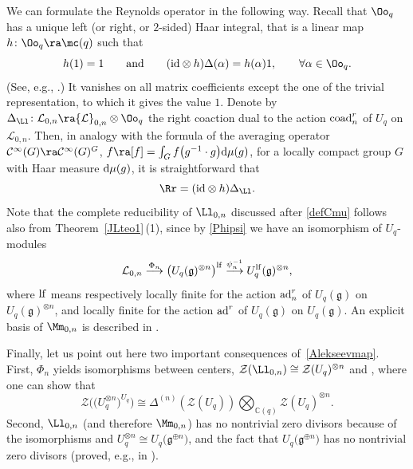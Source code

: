 We can formulate the Reynolds operator in the following way. Recall that $\Oo_q$ has a unique left (or right, or $2$-sided) Haar integral, that is a linear map $h\colon \Oo_q\ra \mc(q)$ such that
\[%
h(1)=1 \qquad \text{and}\qquad ({\rm id}\otimes h)\Delta(\alpha) = h(\alpha)1,\qquad \forall \alpha\in \Oo_q.
\]
(See, e.g., \cite[Proposition 13.3.6]{CP}.) It vanishes on all matrix coefficients except the one of the trivial representation, to which it gives the value $1$. Denote by $\Delta_\Ll\colon {\mathcal L}_{0,n} \ra {\mathcal L}_{0,n}\otimes \Oo_q$ the right coaction dual to the action ${\rm coad}_n^r$ of $U_q$ on ${\mathcal L}_{0,n}$. Then, in analogy with the formula of the averaging operator $\mathcal{C}^\infty(G) \ra \mathcal{C}^\infty(G)^G$, $f\ra [f] = \int_G f\big(g^{-1} \cdot g\big) {\rm d}\mu(g)$, for a locally compact group $G$ with Haar measure ${\rm d}\mu(g)$, it is straightforward that
\begin{equation}\label{formuleRh}
\Rr = ({\rm id}\otimes h)\Delta_\Ll .
\end{equation}
Note that the complete reducibility of $\Ll_{0,n}$ discussed after \eqref{defCmu} follows also from Theorem~\ref{JLteo1}\,(1), since by \eqref{Phipsi} we have an isomorphism of $U_q$-modules
\[%
{\mathcal L}_{0,n} \stackrel{\Phi_n}{\longrightarrow} \big(U_q({\mathfrak g})^{\otimes n}\big)^{\rm lf} \stackrel{\psi_n^{-1}}{\longrightarrow}U_q^{\rm lf}({\mathfrak g})^{\otimes n},
\]
where ${\rm lf}$ means respectively locally finite for the action ${\rm ad}_n^r$ of $U_q({\mathfrak g})$ on $U_q({\mathfrak g})^{\otimes n}$, and locally finite for the action ${\rm ad}^r$ of $U_q({\mathfrak g})$ on $U_q({\mathfrak g})$. An explicit basis of $\Mm_{0,n}$ is described in \cite[Pro\-po\-sition~6.22]{BR}.

Finally, let us point out here two important consequences of~\eqref{Alekseevmap}. First, $\Phi_n$ yields isomorphisms between centers, $\mathcal{Z}(\Ll_{0,n}) \cong \mathcal{Z}(U_q)^{\otimes n}$ and , where one can show that \cite[Lemma 6.29]{BR}
\begin{equation}\label{Zinv}
\mathcal{Z}\big(\big(U_{q}^{\otimes n}\big)^{U_q}\big)\cong \Delta^{(n)}(\mathcal{Z}(U_q))\bigotimes_{{\mathbb C}(q)}\mathcal{Z}(U_q)^{\otimes n}.
\end{equation}
Second, $\Ll_{0,n}$ (and therefore $\Mm_{0,n}$) has no nontrivial zero divisors because of the isomorphisms  and $U_q^{\otimes n}\cong U_q\big(\mathfrak{g}^{\oplus n}\big)$, and the fact that $U_q\big(\mathfrak{g}^{\oplus n}\big)$ has no nontrivial zero divisors (proved, e.g., in \cite{DC-K}).

